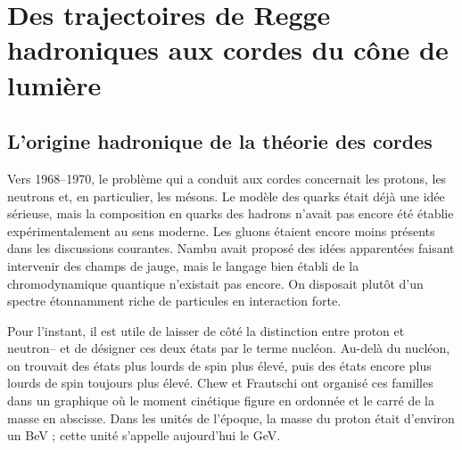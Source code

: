 \chapter{Des trajectoires de Regge hadroniques aux cordes du cône de lumière}


\section{L’origine hadronique de la théorie des cordes}

Vers 1968--1970, le problème qui a conduit aux cordes concernait les protons, les neutrons et, en particulier, les mésons. Le modèle des quarks était déjà une idée sérieuse, mais la composition en quarks des hadrons n’avait pas encore été établie expérimentalement au sens moderne. Les gluons étaient encore moins présents dans les discussions courantes. Nambu avait proposé des idées apparentées faisant intervenir des champs de jauge, mais le langage bien établi de la chromodynamique quantique n’existait pas encore. On disposait plutôt d’un spectre étonnamment riche de particules en interaction forte.

Pour l’instant, il est utile de laisser de côté la distinction entre proton et neutron-- et de désigner ces deux états par le terme nucléon. Au-delà du nucléon, on trouvait des états plus lourds de spin plus élevé, puis des états encore plus lourds de spin toujours plus élevé. Chew et Frautschi ont organisé ces familles dans un graphique où le moment cinétique figure en ordonnée et le carré de la masse en abscisse. Dans les unités de l’époque, la masse du proton était d’environ un BeV ; cette unité s’appelle aujourd’hui le GeV.


